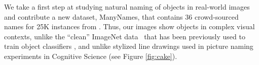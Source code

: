 
We take a first step at studying natural naming of objects in real-world images and contribute a new dataset, ManyNames, that contains 36 crowd-sourced names for 25K instances from \vg.
Thus, our images show objects in complex visual contexts,
unlike the ``clean'' ImageNet data~\cite{imagenet_cvpr09} that has been previously used to train object classifiers \cite{ILSVRC15}, and unlike stylized line drawings used in picture naming experiments in Cognitive Science (see Figure \ref{fig:cake}).

